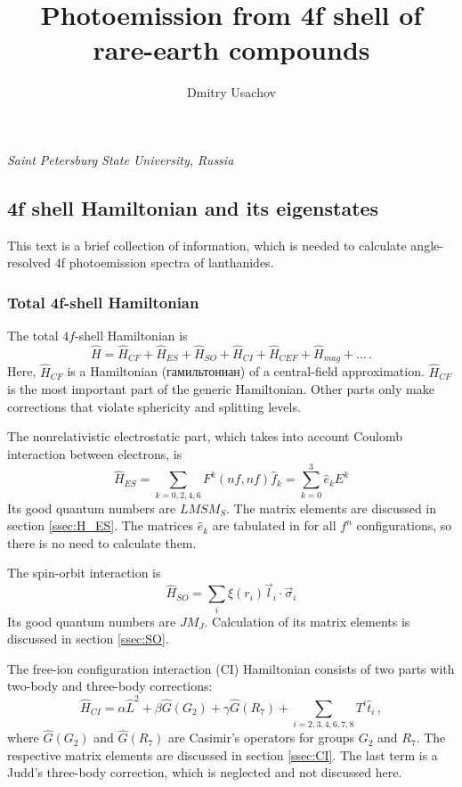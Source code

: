 \documentclass[a4paper,oneside,12pt]{extarticle}
\title{Photoemission from 4f shell of rare-earth compounds}
\author{Dmitry Usachov}
\begin{document}
\maketitle
\begin{center} 
\it Saint Petersburg State University, Russia
\end{center}

\tableofcontents
\newpage
%
\subsection {4f shell Hamiltonian and its eigenstates}

This text is a brief collection of information, which is needed to calculate angle-resolved 4f photoemission spectra of lanthanides.

\subsubsection {Total 4f-shell Hamiltonian}
%
The total $4f$-shell Hamiltonian is
%
\begin{equation}
\hat{H} = \hat{H}_{CF} + \hat{H}_{ES} + \hat{H}_{SO} + \hat{H}_{CI} + \hat{H}_{CEF} + \hat{H}_{mag} +\ldots \,.
\end{equation}
%
Here, $\hat{H}_{CF}$ is a Hamiltonian (гамильтониан) of a central-field approximation. $\hat{H}_{CF}$ is the most important part of the generic Hamiltonian. Other parts only make corrections that violate sphericity and splitting levels.

The nonrelativistic electrostatic part, which takes into account Coulomb interaction between electrons, is
$$
\hat{H}_{ES} = \sum_{k=0,2,4,6} F^k(nf,nf) \hat{f}_k = \sum_{k=0}^3 \hat{e}_k E^k
$$
%
Its good quantum numbers are $LMSM_S$. The matrix elements are discussed in section \ref{ssec:H_ES}. The matrices $\hat{e}_k$ are tabulated in \cite{NielsonKoster} for all $f^n$ configurations, so there is no need to calculate them.

The spin-orbit interaction is 
$$
\hat{H}_{SO} = \sum_i \xi(r_i) \vec{l}_i \cdot \vec{\sigma}_i
$$
%
Its good quantum numbers are $JM_J$. Calculation of its matrix elements is discussed in section \ref{ssec:SO}.

The free-ion configuration interaction (CI) Hamiltonian consists of two parts with two-body and three-body corrections:
$$
\hat{H}_{CI} = \alpha \hat{L}^2 + \beta \hat{G} (G_2) + \gamma \hat{G} (R_7)
+ \sum_{i=2,3,4,6,7,8} T^i \hat{t}_i \,,
$$
where $\hat{G}(G_2)$ and $\hat{G}(R_7)$ are Casimir's operators for groups $G_2$ and $R_7$. The respective matrix elements are discussed in section \ref{ssec:CI}. The last term is a Judd's three-body correction, which is neglected and not discussed here.
\end{document}
